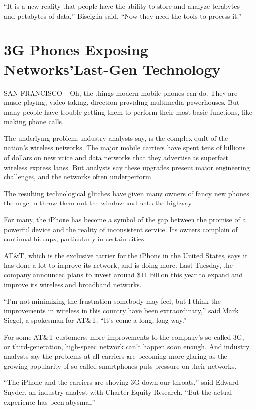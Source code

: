 \documentclass[12pt,a4paper,onecolumn]{article}
\begin{document}
\begin{CJK*}{GBK}{song}
``It is a new reality that people have the ability to store and analyze terabytes and petabytes of
data,'' Bisciglia said. ``Now they need the tools to process it.''

\section{3G Phones Exposing Networks'Last-Gen Technology}

SAN FRANCISCO -- Oh, the things modern mobile phones can do. They are music-playing, video-taking,
direction-providing multimedia powerhouses. But many people have trouble getting them to perform
their most basic functions, like making phone calls.

The underlying problem, industry analysts say, is the complex quilt of the nation's wireless
networks. The major mobile carriers have spent tens of billions of dollars on new voice and data
networks that they advertise as superfast wireless express lanes. But analysts say these upgrades
present major engineering challenges, and the networks often underperform.

The resulting technological glitches have given many owners of fancy new phones the urge to throw
them out the window and onto the highway.

For many, the iPhone has become a symbol of the gap between the promise of a powerful device and the
reality of inconsistent service. Its owners complain of continual hiccups, particularly in certain
cities.

AT\&T, which is the exclusive carrier for the iPhone in the United States, says it has done a lot to
improve its network, and is doing more. Last Tuesday, the company announced plans to invest around
\$11 billion this year to expand and improve its wireless and broadband networks.

``I'm not minimizing the frustration somebody may feel, but I think the improvements in wireless in
this country have been extraordinary,'' said Mark Siegel, a spokesman for AT\&T. ``It's come a long,
long way.''

For some AT\&T customers, more improvements to the company's so-called 3G, or third-generation,
high-speed network can't happen soon enough. And industry analysts say the problems at all carriers
are becoming more glaring as the growing popularity of so-called smartphones puts pressure on their
networks.

``The iPhone and the carriers are shoving 3G down our throats,'' said Edward Snyder, an industry
analyst with Charter Equity Research. ``But the actual experience has been abysmal.''


\end{CJK*}
\end{document}
